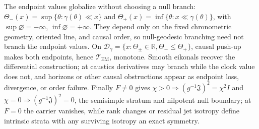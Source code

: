 \documentclass[aps,prl,reprint]{revtex4-2}
\newcommand{\EM}{\mathrm{EM}}
\begin{document}
The endpoint values globalize without choosing a null branch: $\Theta_-(x)=\sup\{\theta:\gamma(\theta)\ll x\}$ and $\Theta_+(x)=\inf\{\theta:x\ll\gamma(\theta)\}$, with $\sup\varnothing=-\infty$, $\inf\varnothing=+\infty$. They depend only on the fixed chronometric geometry, oriented line, and causal order, so null-geodesic branching need not branch the endpoint values. On $\mathcal D_\gamma=\{x:\Theta_\pm\in\mathbb R,\Theta_-\le\Theta_+\}$, causal push-up makes both endpoints, hence $\mathcal T_{\EM}$, monotone. Smooth eikonals recover the differential construction; at caustics derivatives may branch while the clock value does not, and horizons or other causal obstructions appear as endpoint loss, divergence, or order failure. Finally $F\neq0$ gives $\chi>0\Rightarrow(g^{-1}\mathfrak J)^2=\chi^2I$ and $\chi=0\Rightarrow(g^{-1}\mathfrak J)^2=0$, the semisimple stratum and nilpotent null boundary; at $F=0$ the carrier vanishes, while rank changes or residual jet isotropy define intrinsic strata with any surviving isotropy an exact symmetry.
\end{document}
